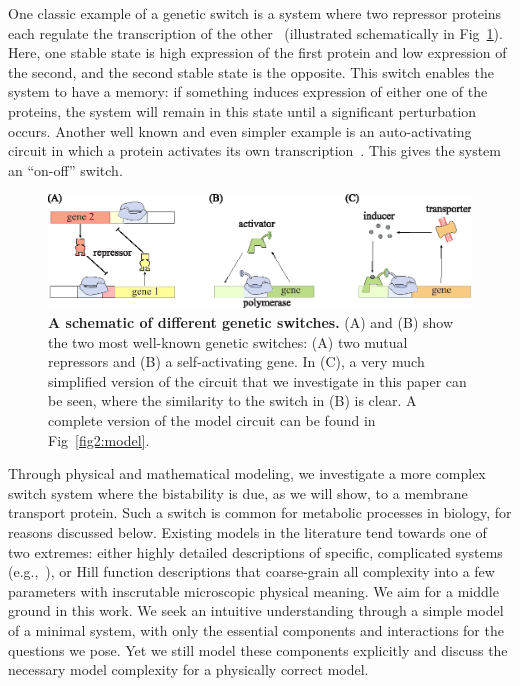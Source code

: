 \documentclass[10pt,letterpaper]{article}
\begin{document}
	One classic example of a genetic switch is a system where two repressor
	proteins each regulate the transcription of the
	other~\cite{Jacob1961,Gardner2000} (illustrated schematically in
	Fig~\ref{fig1:switches}). Here, one stable state is high expression of
	the first protein and low expression of the second,
	and the second stable state is the opposite. This
	switch enables the system to have a memory: if something induces expression
	of either one of the proteins, the system will remain in this state until a
	significant perturbation occurs. Another well known and even simpler example
	is an auto-activating circuit in which a protein activates its own
	transcription~\cite{Wolf1998}. This gives the system an ``on-off'' switch.
	
	\begin{figure}%
		\centering
		\includegraphics{media/Circuits.eps}
		\caption{{\bf A schematic of different genetic switches.}
			(A) and (B) show the two most well-known genetic switches:
			(A) two mutual repressors and (B) a self-activating gene.
			In (C), a very much simplified version of the
			circuit that we investigate in this paper can be seen, where the
			similarity to the switch in (B) is clear. A complete version of
			the model circuit can be found in Fig~\ref{fig2:model}.}
		\label{fig1:switches}
	\end{figure}
	
	Through physical and mathematical modeling, we investigate a more complex
	switch system where the bistability is due, as we will show, to a
	membrane transport protein. Such a switch is common for
	metabolic processes in biology, for reasons discussed below.
	Existing models in the literature tend towards one of two extremes:
	either highly detailed descriptions of specific, complicated systems (e.g.,~\cite{Wong1997}),
	or Hill function descriptions that coarse-grain all complexity
	into a few parameters with inscrutable microscopic physical meaning.
	We aim for a middle ground in this work.
	We seek an intuitive understanding through a simple model of a minimal system,
	with only the essential components and interactions for the questions we pose.
	Yet we still model these components explicitly and
	discuss the necessary model complexity for a physically correct model.
	
\end{document}
